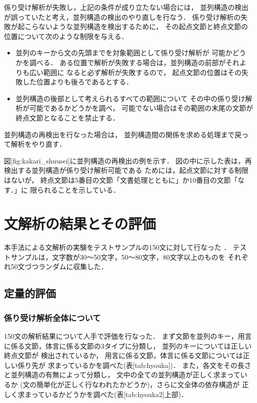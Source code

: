 係り受け解析が失敗し，上記の条件が成り立たない場合には，
並列構造の検出が誤っていたと考え，並列構造の検出のやり直しを行なう．
係り受け解析の失敗が起こらないような並列構造を検出するために，
その起点文節と終点文節の位置について次のような制限を与える．
\begin{itemize}
  \item 並列のキーから文の先頭までを対象範囲として係り受け解析が
可能かどうかを調べる．
ある位置で解析が失敗する場合は，並列構造の前部がそれよりも広い範囲に
なると必ず解析が失敗するので，
起点文節の位置はその失敗した位置よりも後ろであるとする．
  \item 並列構造の後部として考えられるすべての範囲について
その中の係り受け解析が可能であるかどうかを調べ，
可能でない場合はその範囲の末尾の文節が終点文節となることを禁止する．
\end{itemize}
並列構造の再検出を行なった場合は，
並列構造間の関係を求める処理まで戻って解析をやり直す．

{\unitlength=1mm
}

図[fig:kakari_shuusei]に並列構造の再検出の例を示す．
図の中に示した表は，再検出する並列構造が係り受け解析可能である
ためには，起点文節に対する制限はないが，
終点文節は5番目の文節「文書処理とともに」か10番目の文節「なす．」に
限られることを示している．

\section{文解析の結果とその評価} 

本手法による文解析の実験をテストサンプルの150文に対して行なった
．
テストサンプルは，文字数が30〜50文字，50〜80文字，80文字以上のものを
それぞれ50文づつランダムに収集した．





\subsection{定量的評価}

\subsubsection*{係り受け解析全体について}

150文の解析結果について人手で評価を行なった．
まず文節を並列のキー，用言に係る文節，体言に係る文節の3タイプに分類し，
並列のキーについては正しい終点文節が
検出されているか，
用言に係る文節，体言に係る文節については正しい係り先が
求まっているかを調べた(表[tab:hyouka])．
また，各文をその長さと並列構造の有無によって分類し，
文中の全ての並列構造が正しく求まっているか
(文の簡単化が正しく行なわれたかどうか)，さらに文全体の依存構造が
正しく求まっているかどうかを調べた(表[tab:hyouka2]上部)．

